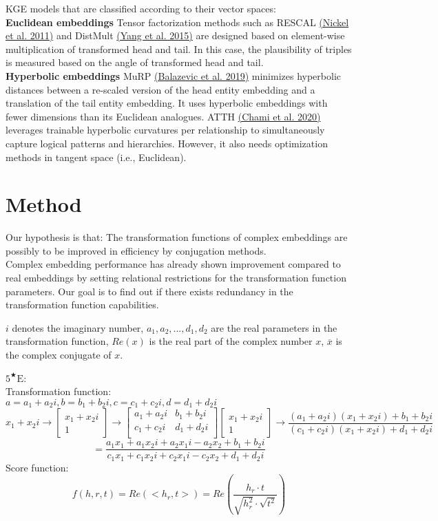 \documentclass[9pt]{ctexart}
\theoremstyle{definition}
\begin{document}
KGE models that are classified according to their vector spaces:\\
\textbf{Euclidean embeddings} Tensor factorization methods such as RESCAL 
\hyperlink{Nic11}{(Nickel et al. 2011)} 
and DistMult 
\hyperlink{Yan15}{(Yang et al. 2015)}
are designed based on element-wise multiplication of transformed head and tail. 
In this case, the plausibility of triples is measured based on the angle of transformed head and tail.\\
\textbf{Hyperbolic embeddings} MuRP 
\hyperlink{Bal19}{(Balazevic et al. 2019)}
minimizes hyperbolic distances between a re-scaled version of the head entity embedding and a translation of the tail entity embedding. 
It uses hyperbolic embeddings with fewer dimensions than its Euclidean analogues.
ATTH 
\hyperlink{Cha20}{(Chami et al. 2020)}
leverages trainable hyperbolic curvatures per relationship to simultaneously capture logical patterns and hierarchies.
However, it also needs optimization methods in tangent space (i.e., Euclidean).

\section{Method}
Our hypothesis is that: The transformation functions of complex embeddings are possibly to be improved in efficiency by conjugation methods.\\ 
Complex embedding performance has already shown improvement compared to real embeddings by setting relational restrictions for the transformation function parameters.
Our goal is to find out if there exists redundancy in the transformation function capabilities.

$i$ denotes the imaginary number, 
$a_1,a_2,...,d_1,d_2$ are the real parameters in the transformation function, 
$Re(x)$ is the real part of the complex number $x$,
$\overline{x}$ is the complex conjugate of $x$.

$5^{\bigstar}\mathrm{E}$:\\
Transformation function:\\
$a=a_1+a_2i, b=b_1+b_2i, c=c_1+c_2i, d=d_1+d_2i$
\[
    x_1+x_2i \rightarrow
    \begin{bmatrix}
        x_1+x_2i\\
        1
    \end{bmatrix}
    \rightarrow
    \begin{bmatrix}
        a_1+a_2i & b_1+b_2i\\
        c_1+c_2i & d_1+d_2i\\
    \end{bmatrix}
    \begin{bmatrix}
        x_1+x_2i\\
        1
    \end{bmatrix}
    \rightarrow
    \frac{(a_1+a_2i)(x_1+x_2i)+b_1+b_2i}{(c_1+c_2i)(x_1+x_2i)+d_1+d_2i} 
    \]
\[
    =\frac{a_1x_1+a_1x_2i+a_2x_1i-a_2x_2+b_1+b_2i}{c_1x_1+c_1x_2i+c_2x_1i-c_2x_2+d_1+d_2i}
    \]
Score function:
\[
    f(h,r,t)=Re(<h_r,t>)=Re(\frac{h_r\cdot t}{\sqrt{h_r^2}\cdot \sqrt{t^2}})
    \]
\end{document}
